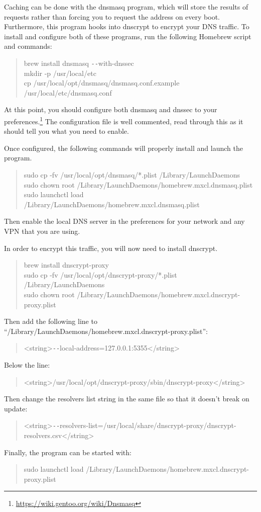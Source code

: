 \documentclass[a4paper,11pt]{report}
\begin{document}
				Caching can be done with the dnsmasq program, which will store the results of requests rather than forcing you to request the address on every boot. 
				Furthermore, this program hooks into dnscrypt to encrypt your DNS traffic. 
				To install and configure both of these programs, run the following Homebrew script and commands:
				\begin{quote}
					brew install dnsmasq \verb+--+with-dnssec \\
					mkdir -p /usr/local/etc \\
					cp /usr/local/opt/dnsmasq/dnsmasq.conf.example /usr/local/etc/dnsmasq.conf \\ %
				\end{quote}
				At this point, you should configure both dnsmasq and dnssec to your preferences.\footnote{\url{https://wiki.gentoo.org/wiki/Dnsmasq}}	
				The configuration file is well commented, read through this as it should tell you what you need to enable. 

				Once configured, the following commands will properly install and launch the program. 
				\begin{quote}
					sudo cp -fv /usr/local/opt/dnsmasq/*.plist /Library/LaunchDaemons \\
					sudo chown root /Library/LaunchDaemons/homebrew.mxcl.dnsmasq.plist \\
					sudo launchctl load /Library/LaunchDaemons/homebrew.mxcl.dnsmasq.plist \\
				\end{quote}
				Then enable the local DNS server in the preferences for your network and any VPN that you are using. 

				In order to encrypt this traffic, you will now need to install dnscrypt. 
				\begin{quote}
					brew install dnscrypt-proxy \\
					sudo cp -fv /usr/local/opt/dnscrypt-proxy/*.plist /Library/LaunchDaemons \\
					sudo chown root /Library/LaunchDaemons/homebrew.mxcl.dnscrypt-proxy.plist \\
				\end{quote}
				Then add the following line to ``/Library/LaunchDaemons/homebrew.mxcl.dnscrypt-proxy.plist'':
				\begin{quote}
					<string>\verb+--+local-address=127.0.0.1:5355</string>
				\end{quote}
				Below the line:
				\begin{quote}
					<string>/usr/local/opt/dnscrypt-proxy/sbin/dnscrypt-proxy</string>
				\end{quote}
				Then change the resolvers list string in the same file so that it doesn't break on update:
				\begin{quote}
					<string>\verb+--+resolvers-list=/usr/local/share/dnscrypt-proxy/dnscrypt-resolvers.csv</string>
				\end{quote}
				Finally, the program can be started with:
				\begin{quote}
					sudo launchctl load /Library/LaunchDaemons/homebrew.mxcl.dnscrypt-proxy.plist
				\end{quote}
\end{document}
